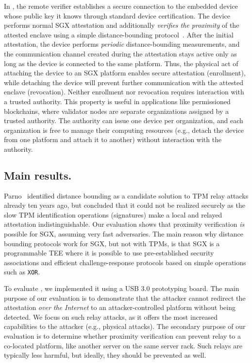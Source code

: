 In \name, the remote verifier establishes a secure connection to the embedded device whose public key it knows through standard device certification. The device performs normal SGX attestation and additionally \emph{verifies the proximity} of the attested enclave using a simple distance-bounding protocol~\cite{distanceBounding}. After the initial attestation, the device performs \emph{periodic} distance-bounding measurements, and the communication channel created during the attestation stays active only as long as the device is connected to the same platform. Thus, the physical act of attaching the device to an SGX platform enables secure attestation (enrollment), while detaching the device will prevent further communication with the attested enclave (revocation). Neither enrollment nor revocation requires interaction with a trusted authority. This property is useful in applications like permissioned blockchains, where validator nodes are separate organizations assigned by a trusted authority. The authority can issue one device per organization, and each organization is free to manage their computing resources (e.g., detach the device from one platform and attach it to another) without interaction with the authority. 


\subsection{Main results.} Parno~\cite{parno2008bootstrapping} identified distance bounding as a candidate solution to TPM relay attacks already ten years ago, but concluded that it could not be realized securely as the slow TPM identification operations (signatures) make a local and relayed attestation indistinguishable. Our evaluation shows that proximity verification \emph{is} possible for SGX, assuming very fast adversaries. The main reason why distance bounding protocols work for SGX, but not with TPMs, is that SGX is a programmable TEE where it is possible to use pre-established security associations and efficient challenge-response protocols based on simple operations such as \texttt{XOR}.

To evaluate \name, we implemented it using a USB 3.0 prototyping board. The main purpose of our evaluation is to demonstrate that the attacker cannot redirect the attestation \emph{over the Internet} to an attacker-controlled platform without being detected. We focus on such relay attacks, as it offers the most increased capabilities to the attacker (e.g., physical attacks). The secondary purpose of our evaluation is to determine whether proximity verification can prevent relay to a co-located platform, like another server on the same server rack. Such relays are typically less harmful, but ideally, they should be prevented as well.



